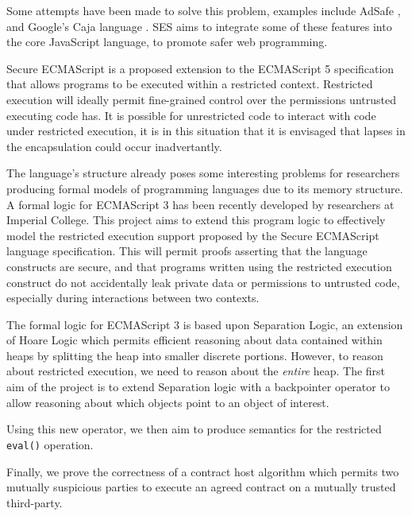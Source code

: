 \documentclass[a4paper]{report}
\begin{document}
  Some attempts have been made to solve this problem, examples include AdSafe
  \cite{AdSafe}, and Google's Caja language \cite{miller2008caja}. SES aims to
  integrate some of these features into the core JavaScript language, to promote
  safer web programming.

  Secure ECMAScript is a proposed extension to the ECMAScript 5 specification
  that allows programs to be executed within a restricted context. Restricted
  execution will ideally permit fine-grained control over the permissions
  untrusted executing code has. It is possible for unrestricted code to interact
  with code under restricted execution, it is in this situation that it is
  envisaged that lapses in the encapsulation could occur inadvertantly.

  The language's structure already poses some interesting problems for
  researchers producing formal models of programming languages due to its memory
  structure.  A formal logic for ECMAScript 3 has been recently developed by
  researchers at Imperial College. This project aims to extend this program
  logic to effectively model the restricted execution support proposed by the
  Secure ECMAScript language specification. This will permit proofs asserting
  that the language constructs are secure, and that programs written using the
  restricted execution construct do not accidentally leak private data or
  permissions to untrusted code, especially during interactions between two
  contexts.

  The formal logic for ECMAScript 3 is based upon Separation Logic, an extension
  of Hoare Logic which permits efficient reasoning about data contained within
  heaps by splitting the heap into smaller discrete portions. However, to reason
  about restricted execution, we need to reason about the \emph{entire}
  heap. The first aim of the project is to extend Separation logic with a
  backpointer operator to allow reasoning about which objects point to an
  object of interest.

  Using this new operator, we then aim to produce semantics for the restricted
  \texttt{eval()} operation.

  Finally, we prove the correctness of a contract host algorithm
  \cite{contract-host-algo} which permits
  two mutually suspicious parties to execute an agreed contract on a mutually
  trusted third-party.


\end{document}
